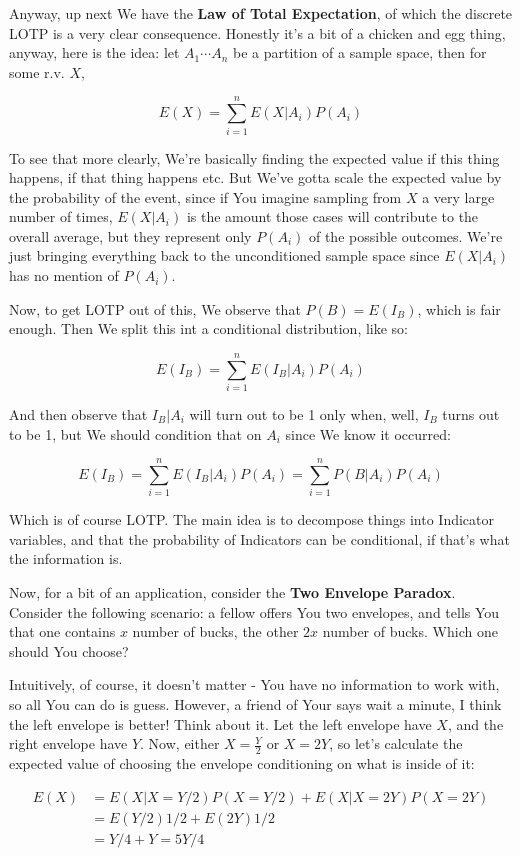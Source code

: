 \documentclass{article}
\begin{document}
		Anyway, up next We have the \textbf{Law of Total Expectation}, of which the discrete LOTP is a very clear consequence. Honestly it's a bit of a chicken and egg thing, anyway, here is the idea: let $A_1\cdots A_n$ be a partition of a sample space, then for some r.v. $X$,
		
		\[ E(X) = \sum^n_{i=1} E(X|A_i)P(A_i) \]

		To see that more clearly, We're basically finding the expected value if this thing happens, if that thing happens etc. But We've gotta scale the expected value by the probability of the event, since if You imagine sampling from $X$ a very large number of times, $E(X|A_i)$ is the amount those cases will contribute to the overall average, but they represent only $P(A_i)$ of the possible outcomes. We're just bringing everything back to the unconditioned sample space since $E(X|A_i)$ has no mention of $P(A_i)$.
		
		Now, to get LOTP out of this, We observe that $P(B) = E(I_B)$, which is fair enough. Then We split this int a conditional distribution, like so:
		
		\[ E(I_B) = \sum^n_{i=1}E(I_B|A_i)P(A_i) \]
		
		And then observe that $I_B|A_i$ will turn out to be 1 only when, well, $I_B$ turns out to be 1, but We should condition that on $A_i$ since We know it occurred:
		
		\[ E(I_B) =  \sum^n_{i=1}E(I_B|A_i)P(A_i)  = \sum^n_{i=1}P(B|A_i)P(A_i) \]
		
		Which is of course LOTP. The main idea is to decompose things into Indicator variables, and that the probability of Indicators can be conditional, if that's what the information is.
		
		Now, for a bit of an application, consider the \textbf{Two Envelope Paradox}. Consider the following scenario: a fellow offers You two envelopes, and tells You that one contains $x$ number of bucks, the other $2x$ number of bucks. Which one should You choose?
		
		Intuitively, of course, it doesn't matter - You have no information to work with, so all You can do is guess. However, a friend of Your says wait a minute, I think the left envelope is better! Think about it. Let the left envelope have $X$, and the right envelope have $Y$. Now, either $X=\frac{Y}{2}$ or $X=2Y$, so let's calculate the expected value of choosing the envelope conditioning on what is inside of it:
		
		\begin{align*}
		E(X) &= E(X|X=Y/2)P(X=Y/2) + E(X|X=2Y)P(X=2Y)\\
		&= E(Y/2)1/2 + E(2Y)1/2\\
		&= Y/4 + Y = 5Y/4
		\end{align*}
\end{document}

